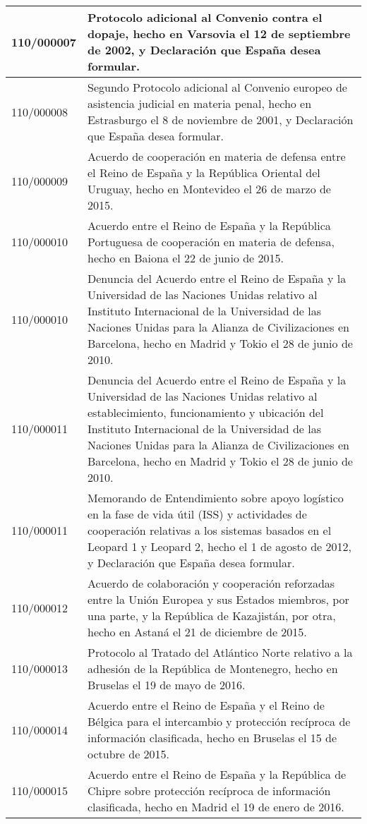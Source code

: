 {\begin{table}[H]
\begin{center}
\begin{tabularx}{\linewidth}{| l | X |}
\hline
110/000007 & Protocolo adicional al Convenio contra el dopaje, hecho en Varsovia el 12 de septiembre de 2002, y Declaración que España desea formular. \\
\hline
110/000008 & Segundo Protocolo adicional al Convenio europeo de asistencia judicial en materia penal, hecho en Estrasburgo el 8 de noviembre de 2001, y Declaración que España desea formular. \\
\hline
110/000009 & Acuerdo de cooperación en materia de defensa entre el Reino de España y la República Oriental del Uruguay, hecho en Montevideo el 26 de marzo de 2015. \\
\hline
110/000010 & Acuerdo entre el Reino de España y la República Portuguesa de cooperación en materia de defensa, hecho en Baiona el 22 de junio de 2015. \\
\hline
110/000010 & Denuncia del Acuerdo entre el Reino de España y la Universidad de las Naciones Unidas relativo al Instituto Internacional de la Universidad de las Naciones Unidas para la Alianza de Civilizaciones en Barcelona, hecho en Madrid y Tokio el 28 de junio de 2010. \\
\hline
110/000011 & Denuncia del Acuerdo entre el Reino de España y la Universidad de las Naciones Unidas relativo al establecimiento, funcionamiento y ubicación del Instituto Internacional de la Universidad de las Naciones Unidas para la Alianza de Civilizaciones en Barcelona, hecho en Madrid y Tokio el 28 de junio de 2010. \\
\hline
110/000011 & Memorando de Entendimiento sobre apoyo logístico en la fase de vida útil (ISS) y actividades de cooperación relativas a los sistemas basados en el Leopard 1 y Leopard 2, hecho el 1 de agosto de 2012, y Declaración que España desea formular. \\
\hline
110/000012 & Acuerdo de colaboración y cooperación reforzadas entre la Unión Europea y sus Estados miembros, por una parte, y la República de Kazajistán, por otra, hecho en Astaná el 21 de diciembre de 2015. \\
\hline
110/000013 & Protocolo al Tratado del Atlántico Norte relativo a la adhesión de la República de Montenegro, hecho en Bruselas el 19 de mayo de 2016. \\
\hline
110/000014 & Acuerdo entre el Reino de España y el Reino de Bélgica para el intercambio y protección recíproca de información clasificada, hecho en Bruselas el 15 de octubre de 2015. \\
\hline
110/000015 & Acuerdo entre el Reino de España y la República de Chipre sobre protección recíproca de información clasificada, hecho en Madrid el 19 de enero de 2016. \\

\end{tabularx}
\end{center}
\end{table}}
